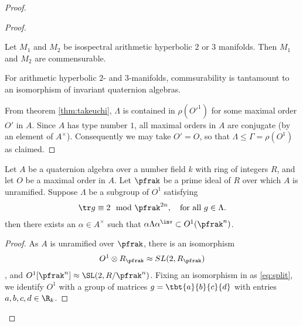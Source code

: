 \begin{proof}
\begin{proof}
\begin{thm}
      Let $M_1$ and $M_2$ be isospectral arithmetic hyperbolic $2$ or $3$ manifolds. Then $M_1$ and $M_2$ are commensurable.
    \end{thm}
    For arithmetic hyperbolic $2$- and $3$-manifolds, commsurability is tantamount to an isomorphism of invariant quaternion algebras.

    From theorem \ref{thm:takeuchi}, $\Lambda$ is contained in $\rho(O'^1)$ for some maximal order $O'$ in $A$. Since $A$ has type number $1$, all maximal orders in $A$ are conjugate (by an element of $A^\times$). Consequently we may take $O'=O$, so that $\Lambda \leq \Gamma = \rho(O^1)$ as claimed.


  \end{proof}
  \begin{lemma}\label{lemma:MangosteenPicosdeEuropa}
    Let $A$ be a quaternion algebra over a number field $k$ with ring of integers $R$, and let $O$ be a maximal order in $A$.
    Let $\pfrak$ be a prime ideal of $R$ over which $A$ is unramified.
    Suppose $\Lambda$ be a subgroup of $O^1$ satisfying
    \begin{align}\label{eq:trace}
      \tr g \equiv 2 \mod \pfrak^{2n}, \quad \text{for all $g \in \Lambda$}.
    \end{align}
    then there exists an $\alpha \in A^\times$ such that $\alpha \Lambda \alpha^\inv \subset O^1(\pfrak^n)$.
  \end{lemma}
  \begin{proof}


    As $A$ is unramified over $\pfrak$, there is an isomorphism
    \begin{align}\label{eq:split}
      O^1 \otimes R_\pfrak \approx SL(2,R_\pfrak)
    \end{align}, and $O^1[\pfrak^n] \approx \SL(2,R/\pfrak^n)$. Fixing an isomorphism in as \ref{eq:split}, we identify $O^1$ with a group of matrices $g = \tbt{a}{b}{c}{d}$ with entries $a,b,c,d \in \R_k$.


\end{proof}
\end{proof}
